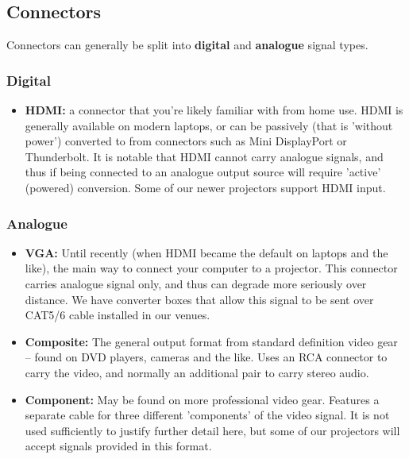 \documentclass[14pt]{article} %
\let\Oldsubsection\subsection
\renewcommand{\subsection}{\FloatBarrier\Oldsubsection}
\let\Oldsubsubsection\subsubsection
\renewcommand{\subsubsection}{\FloatBarrier\Oldsubsubsection}
\begin{document}
\subsection{Connectors}

Connectors can generally be split into \textbf{digital} and \textbf{analogue} signal types. 

\subsubsection{Digital}
\begin{itemize}
\item \textbf{HDMI: } a connector that you're likely familiar with from home use. HDMI is generally available on modern laptops, or can be passively (that is 'without power') converted to from connectors such as Mini DisplayPort or Thunderbolt. It is notable that HDMI cannot carry analogue signals, and thus if being connected to an analogue output source will require 'active' (powered) conversion. Some of our newer projectors support HDMI input.
\end{itemize}

\subsubsection{Analogue}
\begin{itemize}
\item \textbf{VGA: } Until recently (when HDMI became the default on laptops and the like), the main way to connect your computer to a projector. This connector carries analogue signal only, and thus can degrade more seriously over distance. We have converter boxes that allow this signal to be sent over CAT5/6 cable installed in our venues.
\item \textbf{Composite: } The general output format from standard definition video gear -- found on DVD players, cameras and the like. Uses an RCA connector to carry the video, and normally an additional pair to carry stereo audio.
\item \textbf{Component: } May be found on more professional video gear. Features a separate cable for three different 'components' of the video signal. It is not used sufficiently to justify further detail here, but some of our projectors will accept signals provided in this format.
\end{itemize}


%

 
\end{document}
